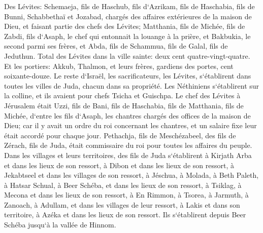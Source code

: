 \verse Des Lévites: Schemaeja, fils de Haschub, fils d`Azrikam, fils de Haschabia, fils de Bunni, 
\verse Schabbethaï et Jozabad, chargés des affaires extérieures de la maison de Dieu, et faisant partie des chefs des Lévites; 
\verse Matthania, fils de Michée, fils de Zabdi, fils d`Asaph, le chef qui entonnait la louange à la prière, et Bakbukia, le second parmi ses frères, et Abda, fils de Schammua, fils de Galal, fils de Jeduthun. 
\verse Total des Lévites dans la ville sainte: deux cent quatre-vingt-quatre. 
\verse Et les portiers: Akkub, Thalmon, et leurs frères, gardiens des portes, cent soixante-douze. 
\verse Le reste d`Israël, les sacrificateurs, les Lévites, s`établirent dans toutes les villes de Juda, chacun dans sa propriété. 
\verse Les Néthiniens s`établirent sur la colline, et ils avaient pour chefs Tsicha et Guischpa. 
\verse Le chef des Lévites à Jérusalem était Uzzi, fils de Bani, fils de Haschabia, fils de Matthania, fils de Michée, d`entre les fils d`Asaph, les chantres chargés des offices de la maison de Dieu; 
\verse car il y avait un ordre du roi concernant les chantres, et un salaire fixe leur était accordé pour chaque jour. 
\verse Pethachja, fils de Meschézabeel, des fils de Zérach, fils de Juda, était commissaire du roi pour toutes les affaires du peuple. 
\verse Dans les villages et leurs territoires, des fils de Juda s`établirent à Kirjath Arba et dans les lieux de son ressort, à Dibon et dans les lieux de son ressort, à Jekabtseel et dans les villages de son ressort, 
\verse à Jéschua, à Molada, à Beth Paleth, 
\verse à Hatsar Schual, à Beer Schéba, et dans les lieux de son ressort, 
\verse à Tsiklag, à Mecona et dans les lieux de son ressort, 
\verse à En Rimmon, à Tsorea, à Jarmuth, 
\verse à Zanoach, à Adullam, et dans les villages de leur ressort, à Lakis et dans son territoire, à Azéka et dans les lieux de son ressort. Ils s`établirent depuis Beer Schéba jusqu`à la vallée de Hinnom. 
